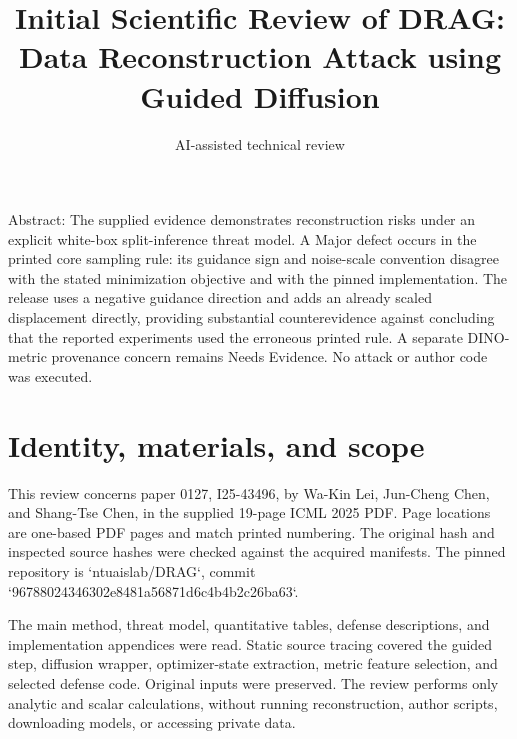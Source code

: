\documentclass[10pt]{article}
\title{Initial Scientific Review of
DRAG: Data Reconstruction Attack
using Guided Diffusion}
\author{AI-assisted technical review}
\date{}
\begin{document}
\maketitle
Abstract: The supplied evidence demonstrates reconstruction risks under an explicit white-box split-inference threat model. A Major defect occurs in the printed core sampling rule: its guidance sign and noise-scale convention disagree with the stated minimization objective and with the pinned implementation. The release uses a negative guidance direction and adds an already scaled displacement directly, providing substantial counterevidence against concluding that the reported experiments used the erroneous printed rule. A separate DINO-metric provenance concern remains Needs Evidence. No attack or author code was executed.\par
\section*{Identity, materials, and scope}
This review concerns paper 0127, I25-43496, by Wa-Kin Lei, Jun-Cheng Chen, and Shang-Tse Chen, in the supplied 19-page ICML 2025 PDF. Page locations are one-based PDF pages and match printed numbering. The original hash and inspected source hashes were checked against the acquired manifests. The pinned repository is `ntuaislab/DRAG`, commit `96788024346302e8481a56871d6c4b4b2c26ba63`.\par
The main method, threat model, quantitative tables, defense descriptions, and implementation appendices were read. Static source tracing covered the guided step, diffusion wrapper, optimizer-state extraction, metric feature selection, and selected defense code. Original inputs were preserved. The review performs only analytic and scalar calculations, without running reconstruction, author scripts, downloading models, or accessing private data.\par
\end{document}
